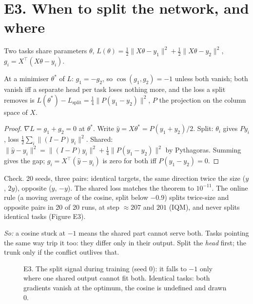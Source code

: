 \section*{E3. When to split the network, and where}
Two tasks share parameters $\theta$, $L(\theta)=\tfrac12\|X\theta-y_1\|^2+\tfrac12\|X\theta-y_2\|^2$, $g_i=X^\top(X\theta-y_i)$.
\begin{theorem} At a minimiser $\theta^*$ of $L$: $g_1=-g_2$, so $\cos(g_1,g_2)=-1$ unless both vanish; both vanish iff a
separate head per task loses nothing more, and the loss a split removes is
$L(\theta^*)-L_{\text{split}}=\tfrac14\|P(y_1-y_2)\|^2$, $P$ the projection on the column space of $X$.\end{theorem}
\begin{proof} $\nabla L=g_1+g_2=0$ at $\theta^*$. Write $\hat y=X\theta^*=P(y_1+y_2)/2$. Split: $\theta_i$ gives $Py_i$, loss
$\tfrac12\sum_i\|(I-P)y_i\|^2$. Shared: $\|\hat y-y_i\|^2=\|(I-P)y_i\|^2+\tfrac14\|P(y_1-y_2)\|^2$ by Pythagoras. Summing
gives the gap; $g_i=X^\top(\hat y-y_i)$ is zero for both iff $P(y_1-y_2)=0$.\end{proof}
\noindent Check. 20 seeds, three pairs: identical targets, the same direction twice the size ($y$, $2y$), opposite
($y$, $-y$). The shared loss matches the theorem to $10^{-11}$. The online rule (a moving average of the cosine,
split below $-0.9$) splits twice-size and opposite pairs in 20 of 20 runs, at step $\approx 207$ and $201$ (IQM), and
never splits identical tasks (Figure E3).

\emph{So:} a cosine stuck at $-1$ means the shared part cannot serve both. Tasks pointing the same way trip it too: they
differ only in their output. Split the \emph{head} first; the trunk only if the conflict outlives that.

\begin{figure}[h]\centering
{}
\caption{E3. The split signal during training (seed 0): it falls to $-1$ only where one shared output cannot fit both. Identical tasks: both gradients vanish at the optimum, the cosine is undefined and drawn $0$.}
\end{figure}
